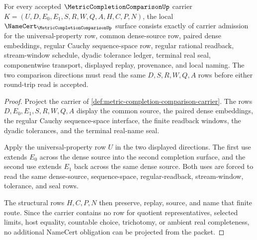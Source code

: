 \begin{theorem}
\label{thm:metric-completion-comparison-namecert-obligations}
For every accepted $\MetricCompletionComparisonUp$ carrier $K=(U,D,E_0,E_1,S,R,W,Q,A,H,C,P,N)$, the local $\NameCert_{\MetricCompletionComparisonUp}$ surface consists exactly of carrier admission for the universal-property row, common dense-source row, paired dense embeddings, regular Cauchy sequence-space row, regular rational readback, stream-window schedule, dyadic tolerance ledger, terminal real seal, componentwise transport, displayed replay, provenance, and local naming. The two comparison directions must read the same $D,S,R,W,Q,A$ rows before either round-trip read is accepted.
\end{theorem}
\begin{proof}
Project the carrier of \autoref{def:metric-completion-comparison-carrier}. The rows $D,E_0,E_1,S,R,W,Q,A$ display the common source, the paired dense embeddings, the regular Cauchy sequence-space interface, the finite readback windows, the dyadic tolerances, and the terminal real-name seal.

Apply the universal-property row $U$ in the two displayed directions. The first use extends $E_0$ across the dense source into the second completion surface, and the second use extends $E_1$ back across the same dense source. Both uses are forced to read the same dense-source, sequence-space, regular-readback, stream-window, tolerance, and seal rows.

The structural rows $H,C,P,N$ then preserve, replay, source, and name that finite route. Since the carrier contains no row for quotient representatives, selected limits, host equality, countable choice, trichotomy, or ambient real completeness, no additional NameCert obligation can be projected from the packet.
\end{proof}

